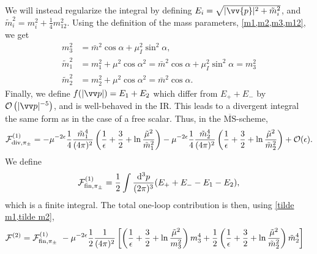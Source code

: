 We will instead regularize the integral by defining $E_i = \sqrt{|\vv{p}|^2 + \tilde m_i^2}$, and $\tilde m_i^2 = m_i^2 + \frac{1}{4} m_{12}^2$.
Using the definition of the mass parameters, \cref{m1,m2,m3,m12}, we get
\begin{align}
    m_3^2 & = \bar m^2 \cos \alpha + \mu_ I^2 \sin^2 \alpha, \\
    \label{tilde m1}
    \tilde m_1^2 
    & 
    = m_1^2 + \mu^2 \cos\alpha^2
    = \bar m^2 \cos \alpha + \mu_I^2 \sin^2 \alpha
    = m_3^2 \\
    \label{tilde m2}
    \tilde m_2^2 
    & = m_2^2 + \mu^2 \cos\alpha^2
    = \bar m^2 \cos \alpha.
\end{align}
Finally, we define $f(|\vv p|) = E_1 + E_2$ which differ from $E_+ + E_-$ by $\Oh[-5]{|\vv p|}$, and is well-behaved in the IR.
This leads to a divergent integral the same form as in the case of a free scalar.
Thus, in the $\mathrm{\overline{MS}}$-scheme, 
\begin{equation}
    \mathcal{F}^{(1)}_{\mathrm{div}, \pi_\pm }
    =
    - \mu^{-2 \epsilon} \frac{1}{4} \frac{\tilde m_1^4}{(4\pi)^2} 
    \left(
        \frac{1}{\epsilon} + \frac{3}{2} + \ln \frac{\tilde \mu^2}{\tilde m_1^2}
    \right) 
    -  \mu^{-2 \epsilon} \frac{1}{4} \frac{\tilde m_2^4}{(4\pi)^2} 
    \left(
        \frac{1}{\epsilon} + \frac{3}{2} + \ln \frac{\tilde \mu^2}{\tilde m_2^2}
    \right) 
    + \mathcal{O}(\epsilon).
\end{equation}
We define
\begin{equation}
    \mathcal{F}^{(1)}_{\mathrm{fin}, \pi_\pm}
    = 
    \frac{1}{2} \int \frac{\dd^3 p}{(2\pi)^3} (E_+ + E_- - E_1 - E_2),
\end{equation}
which is a finite integral.
The total one-loop contribution is then, using \cref{tilde m1,tilde m2},
\begin{align}
    \Ef^{(2)}
    & = 
    \Ef^{(1)}_{\mathrm{fin}, \pi_\pm} 
    - \mu^{-2 \epsilon} \frac{1}{2}\frac{1}{(4\pi)^2}
    \left[
        \left( \frac{1}{\epsilon} + \frac{3}{2} + \ln \frac{\tilde \mu^2}{m_3^2 } \right)
        m_3^4
        +
        \frac{1}{2}
        \left( \frac{1}{\epsilon} + \frac{3}{2} + \ln \frac{\tilde \mu^2}{\tilde m_2^2} \right)
        \tilde m_2^4
    \right]
\end{align}

